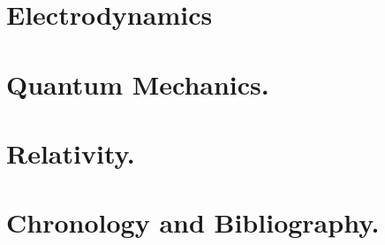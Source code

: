 \part{Electrodynamics}



\part{Quantum Mechanics.}












\part{Relativity.}











\part{Chronology and Bibliography.}


